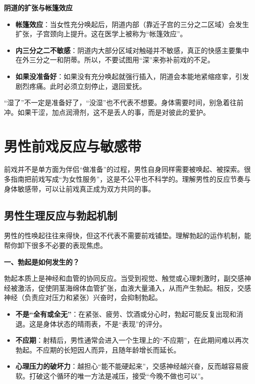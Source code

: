 \documentclass[12pt,UTF8]{ctexbook}
\begin{document}
\textbf{阴道的扩张与帐篷效应}

\begin{itemize}
\item \textbf{帐篷效应}：当女性充分唤起后，阴道内部（靠近子宫的三分之二区域）会发生扩张，子宫颈向上提升。这在医学上被称为“帐篷效应”。
\item \textbf{内三分之二不敏感}：阴道内大部分区域对触碰并不敏感，真正的快感主要集中在外三分之一和阴蒂。所以，不要试图用“深”来弥补前戏的不足。
\item \textbf{如果没准备好}：如果没有充分唤起就强行插入，阴道会本能地紧缩痉挛，引发剧烈疼痛。此时必须立刻停止，退回爱抚。
\end{itemize}

\begin{tcolorbox}[colback=pink!5!white,colframe=red!50!black,title=贴心小叮咛]
“湿了”不一定是准备好了，“没湿”也不代表不想要。身体需要时间，别急着往前冲。如果干涩，加点润滑剂，这不是丢人的事，而是对彼此的爱护。
\end{tcolorbox}

\section{男性前戏反应与敏感带}

前戏并不是单方面为伴侣“做准备”的过程，男性自身同样需要被唤起、被探索。很多指南把前戏写成“为女性服务”，这是不公平也不科学的。理解男性的反应节奏与身体敏感带，可以让前戏真正成为双方共同的事。

\subsection{男性生理反应与勃起机制}

男性的性唤起往往来得快，但这不代表不需要前戏铺垫。理解勃起的运作机制，能帮你卸下很多不必要的表现焦虑。

\textbf{一、勃起是如何发生的？}

勃起本质上是神经和血管的协同反应。当受到视觉、触觉或心理刺激时，副交感神经被激活，促使阴茎海绵体血管扩张，血液大量涌入，从而产生勃起。相反，交感神经（负责应对压力和紧张）兴奋时，会抑制勃起。

\begin{itemize}
\item \textbf{不是“全有或全无”}：在紧张、疲劳、饮酒或分心时，勃起可能反复出现和消退。这是身体状态的晴雨表，不是“表现”的评分。
\item \textbf{不应期}：射精后，男性通常会进入一个生理上的“不应期”，在此期间难以再次勃起。不应期的长短因人而异，且随年龄增长而延长。
\item \textbf{心理压力的破坏力}：越担心“能不能硬起来”，交感神经越兴奋，反而越容易疲软。打破这个循环的唯一方法是减压，接受“今晚不做也可以”。
\end{itemize}
\end{document}
